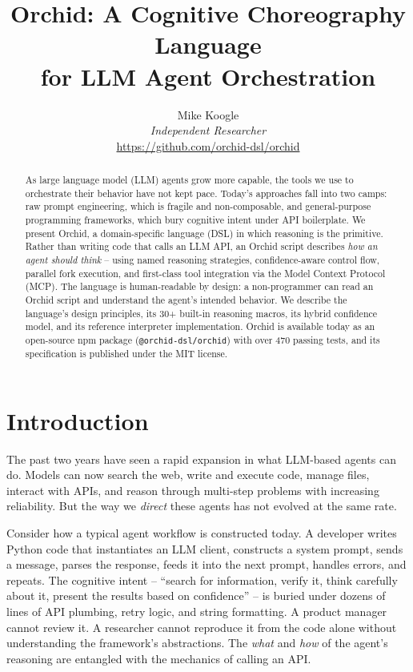 \documentclass[11pt,a4paper]{article}
\title{\textbf{Orchid: A Cognitive Choreography Language\\for LLM Agent Orchestration}}
\author{
  Mike Koogle\\
  \textit{Independent Researcher}\\
  \url{https://github.com/orchid-dsl/orchid}
}
\date{}
\begin{document}
\maketitle

\begin{abstract}
As large language model (LLM) agents grow more capable, the tools we use to orchestrate their behavior have not kept pace. Today's approaches fall into two camps: raw prompt engineering, which is fragile and non-composable, and general-purpose programming frameworks, which bury cognitive intent under API boilerplate. We present Orchid, a domain-specific language (DSL) in which reasoning is the primitive. Rather than writing code that calls an LLM API, an Orchid script describes \emph{how an agent should think} -- using named reasoning strategies, confidence-aware control flow, parallel fork execution, and first-class tool integration via the Model Context Protocol (MCP). The language is human-readable by design: a non-programmer can read an Orchid script and understand the agent's intended behavior. We describe the language's design principles, its 30+ built-in reasoning macros, its hybrid confidence model, and its reference interpreter implementation. Orchid is available today as an open-source npm package (\texttt{@orchid-dsl/orchid}) with over 470 passing tests, and its specification is published under the MIT license.
\end{abstract}

\section{Introduction}

The past two years have seen a rapid expansion in what LLM-based agents can do. Models can now search the web, write and execute code, manage files, interact with APIs, and reason through multi-step problems with increasing reliability. But the way we \emph{direct} these agents has not evolved at the same rate.

Consider how a typical agent workflow is constructed today. A developer writes Python code that instantiates an LLM client, constructs a system prompt, sends a message, parses the response, feeds it into the next prompt, handles errors, and repeats. The cognitive intent -- ``search for information, verify it, think carefully about it, present the results based on confidence'' -- is buried under dozens of lines of API plumbing, retry logic, and string formatting. A product manager cannot review it. A researcher cannot reproduce it from the code alone without understanding the framework's abstractions. The \emph{what} and \emph{how} of the agent's reasoning are entangled with the mechanics of calling an API.
\end{document}
